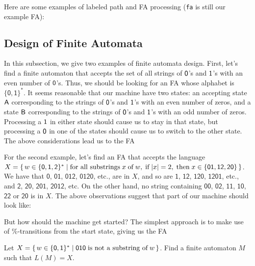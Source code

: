 Here are some examples of labeled path and FA processing
(\texttt{fa} is still our example FA):


\subsection{Design of Finite Automata}

%
In this subsection, we give two examples of finite automata
design.  First, let's find a finite automaton that accepts the set
of all strings of $\mathsf{0}$'s and $\mathsf{1}$'s with an even number of
$\mathsf{0}$'s.  Thus, we should be looking for an FA whose alphabet is
$\{\mathsf{0,1}\}^*$.  It seems reasonable that our machine have two
states: an accepting state $\mathsf{A}$ corresponding to the strings of
$\mathsf{0}$'s and $\mathsf{1}$'s with an even number of zeros, and a state
$\mathsf{B}$ corresponding to the strings of $\mathsf{0}$'s and $\mathsf{1}$'s with
an odd number of zeros.  Processing a $\mathsf{1}$ in either state should
cause us to stay in that state, but processing a $\mathsf{0}$ in one of
the states should cause us to switch to the other state.  The above
considerations lead us to the FA
\begin{center}

\end{center}

For the second example, let's find an FA that accepts the language
$X=\{ \, w\in\mathsf{\{0,1,2\}^*} \mid \allowbreak\mbox{for all substrings}\allowbreak\;x
  \;\allowbreak\mbox{of}\allowbreak\;w,\;\allowbreak\mbox{if}\allowbreak\;|x|=2,\;\allowbreak\mbox{then}\allowbreak\;x\in\{\mathsf{01,12,20}\} \, \}$.
We have that $\mathsf{0}$, $\mathsf{01}$, $\mathsf{012}$,
$\mathsf{0120}$, etc., are in $X$, and so are $\mathsf{1}$,
$\mathsf{12}$, $\mathsf{120}$, $\mathsf{1201}$, etc., and
$\mathsf{2}$, $\mathsf{20}$, $\mathsf{201}$, $\mathsf{2012}$, etc.  On
the other hand, no string containing $\mathsf{00}$, $\mathsf{02}$,
$\mathsf{11}$, $\mathsf{10}$, $\mathsf{22}$ or $\mathsf{20}$ is in
$X$.  The above observations suggest that part of our machine should
look like:
\begin{center}

\end{center}
But how should the machine get started?  The simplest approach is to
make use of $\%$-transitions from the start state, giving us
the FA
\begin{center}

\end{center}

\begin{exercise}
Let $X=\{ \, w\in\{\mathsf{0,1}\}^* \mid \mathsf{010}\;\allowbreak\mbox{is not a
    substring of}\allowbreak\;w \, \}$.  Find a finite automaton $M$ such that $L(M)=X$.
\end{exercise}

